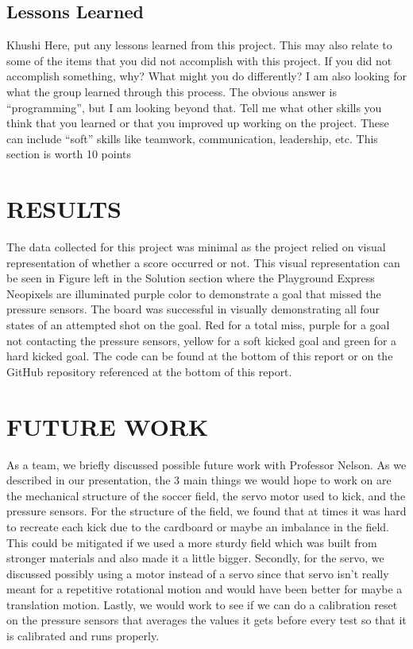 \documentclass[12pt]{article}
\begin{document}
\subsection{Lessons Learned}
Khushi
Here, put any lessons learned from this project.  This may also relate to some of the items that you did not accomplish with this project. If you did not accomplish something, why? What might you do differently? I am also looking for what the group learned through this process. The obvious answer is ``programming'', but I am looking beyond that. Tell me what other skills you think that you learned or that you improved up working on the project. These can include ``soft'' skills like teamwork, communication, leadership, etc. This section is worth 10 points

\section{RESULTS}
The data collected for this project was minimal as the project relied on visual representation of whether a score occurred or not. This visual representation can be seen in Figure left in the Solution section where the Playground Express Neopixels are illuminated purple color to demonstrate a goal that missed the pressure sensors. The board was successful in visually demonstrating all four states of an attempted shot on the goal. Red for a total miss, purple for a goal not contacting the pressure sensors, yellow for a soft kicked goal and green for a hard kicked goal. 
The code can be found at the bottom of this report or on the GitHub repository referenced at the bottom of this report. 

\section{FUTURE WORK}
As a team, we briefly discussed possible future work with Professor Nelson. As we described in our presentation, the 3 main things we would hope to work on are the mechanical structure of the soccer field, the servo motor used to kick, and the pressure sensors. For the structure of the field, we found that at times it was hard to recreate each kick due to the cardboard or maybe an imbalance in the field. This could be mitigated if we used a more sturdy field which was built from stronger materials and also made it a little bigger. Secondly, for the servo, we discussed possibly using a motor instead of a servo since that servo isn't really meant for a repetitive rotational motion and would have been better for maybe a translation motion. Lastly, we would work to see if we can do a calibration reset on the pressure sensors that averages the values it gets before every test so that it is calibrated and runs properly. 
\end{document}
